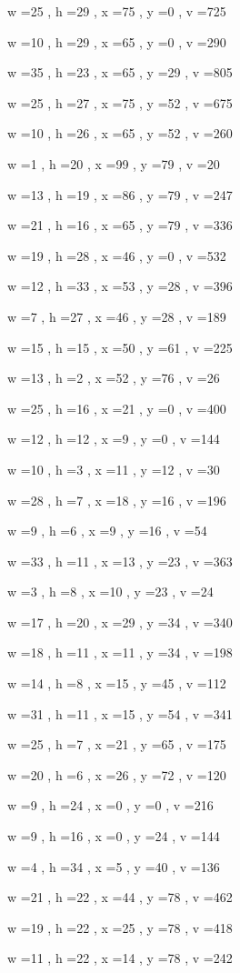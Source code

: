 \documentclass[11pt]{article}
\begin{document}
w =25 , h =29 , x =75 , y =0 , v =725
\par
w =10 , h =29 , x =65 , y =0 , v =290
\par
w =35 , h =23 , x =65 , y =29 , v =805
\par
w =25 , h =27 , x =75 , y =52 , v =675
\par
w =10 , h =26 , x =65 , y =52 , v =260
\par
w =1 , h =20 , x =99 , y =79 , v =20
\par
w =13 , h =19 , x =86 , y =79 , v =247
\par
w =21 , h =16 , x =65 , y =79 , v =336
\par
w =19 , h =28 , x =46 , y =0 , v =532
\par
w =12 , h =33 , x =53 , y =28 , v =396
\par
w =7 , h =27 , x =46 , y =28 , v =189
\par
w =15 , h =15 , x =50 , y =61 , v =225
\par
w =13 , h =2 , x =52 , y =76 , v =26
\par
w =25 , h =16 , x =21 , y =0 , v =400
\par
w =12 , h =12 , x =9 , y =0 , v =144
\par
w =10 , h =3 , x =11 , y =12 , v =30
\par
w =28 , h =7 , x =18 , y =16 , v =196
\par
w =9 , h =6 , x =9 , y =16 , v =54
\par
w =33 , h =11 , x =13 , y =23 , v =363
\par
w =3 , h =8 , x =10 , y =23 , v =24
\par
w =17 , h =20 , x =29 , y =34 , v =340
\par
w =18 , h =11 , x =11 , y =34 , v =198
\par
w =14 , h =8 , x =15 , y =45 , v =112
\par
w =31 , h =11 , x =15 , y =54 , v =341
\par
w =25 , h =7 , x =21 , y =65 , v =175
\par
w =20 , h =6 , x =26 , y =72 , v =120
\par
w =9 , h =24 , x =0 , y =0 , v =216
\par
w =9 , h =16 , x =0 , y =24 , v =144
\par
w =4 , h =34 , x =5 , y =40 , v =136
\par
w =21 , h =22 , x =44 , y =78 , v =462
\par
w =19 , h =22 , x =25 , y =78 , v =418
\par
w =11 , h =22 , x =14 , y =78 , v =242
\par
\newpage
\end{document}
